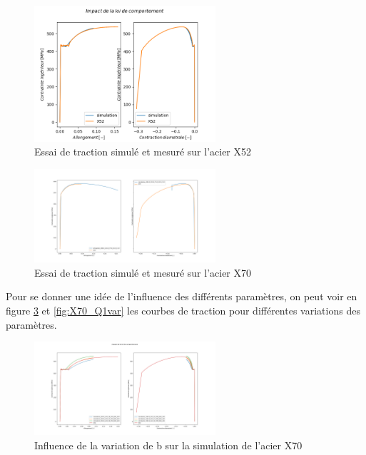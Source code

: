 \documentclass[a4paper, french, 11pt, draft]{article}
\begin{document}
    \begin{figure}[ht]
        \includegraphics[width=0.6\textwidth]{image/INFLUENCE/X52_fit.png}
        \centering
        \caption{Essai de traction simulé et mesuré sur l'acier X52}
        \label{fig:X52_fit}       
    \end{figure}
    \begin{figure}[hbt]
        \includegraphics[width=0.6\textwidth]{image/INFLUENCE/X70_fit.png}
        \centering
        \caption{Essai de traction simulé et mesuré sur l'acier X70} 
        \label{fig:X70_fit}       
    \end{figure}

    Pour se donner une idée de l'influence des différents paramètres, on peut voir en figure \ref{fig:X52_bvar} et \ref{fig:X70_Q1var} les courbes de traction pour différentes variations des paramètres.
    
    \begin{figure}[hbt]
        \includegraphics[width=0.6\textwidth]{image/INFLUENCE/X52_b_var_18 23_30.png}
        \centering
        \caption{Influence de la variation de b sur la simulation de l'acier X70}
 
        \label{fig:X52_bvar}
    \end{figure}
\end{document}
